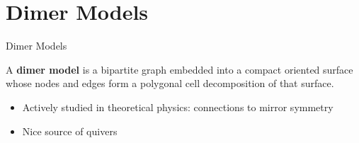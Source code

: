 \section{Dimer Models}

\begin{frame}{Dimer Models}
    \begin{definition}
        A \textbf{dimer model} is a bipartite graph embedded into a compact oriented surface whose nodes and edges form a polygonal cell decomposition of that surface.
    \end{definition}

    \begin{itemize}
        \item Actively studied in theoretical physics: connections to mirror symmetry
        
        \item Nice source of quivers
    \end{itemize}
\end{frame}

